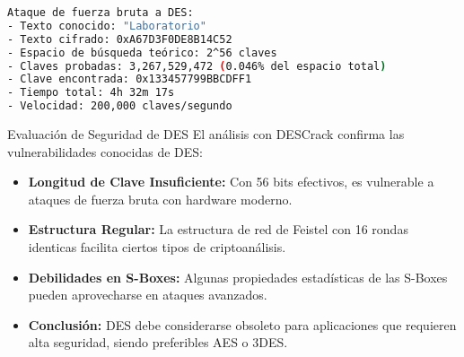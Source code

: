 \begin{lstlisting}[language=bash, caption={Resultado de Ataque a DES}, label=lst:des-ataque]
Ataque de fuerza bruta a DES:
- Texto conocido: "Laboratorio"
- Texto cifrado: 0xA67D3F0DE8B14C52
- Espacio de búsqueda teórico: 2^56 claves
- Claves probadas: 3,267,529,472 (0.046% del espacio total)
- Clave encontrada: 0x133457799BBCDFF1
- Tiempo total: 4h 32m 17s
- Velocidad: 200,000 claves/segundo
\end{lstlisting}

\begin{cryptoanalysis}{Evaluación de Seguridad de DES}
	El análisis con DESCrack confirma las vulnerabilidades conocidas de DES:

	\begin{itemize}
		\item \textbf{Longitud de Clave Insuficiente:} Con 56 bits efectivos, es vulnerable a ataques de fuerza bruta con hardware moderno.

		\item \textbf{Estructura Regular:} La estructura de red de Feistel con 16 rondas identicas facilita ciertos tipos de criptoanálisis.

		\item \textbf{Debilidades en S-Boxes:} Algunas propiedades estadísticas de las S-Boxes pueden aprovecharse en ataques avanzados.

		\item \textbf{Conclusión:} DES debe considerarse obsoleto para aplicaciones que requieren alta seguridad, siendo preferibles AES o 3DES.
	\end{itemize}
\end{cryptoanalysis}